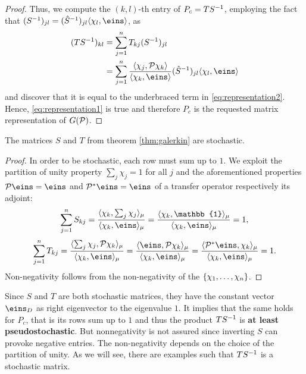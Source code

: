 \begin{proof}
Thus, we compute the $(k,l)$-th entry of $P_c = TS^{-1}$, employing the fact that $(S\inv)_{jl} = (\hat{S}\inv)_{jl} \langle \chi_l, \eins \rangle$, as
\begin{align*}
(TS^{-1})_{kl} & = \sum_{j=1}^n T_{kj} (S\inv)_{jl} \\
 &  = \sum_{j=1}^n \frac{\langle \chi_j, \Pcal \chi_k \rangle}{\langle \chi_k, \eins \rangle}
(\hat{S}\inv)_{jl} \langle \chi_l, \eins \rangle
\end{align*}
and discover that it is equal to the underbraced term in \eqref{eq:representation2}.
Hence, \eqref{eq:representation1} is true and therefore $P_c$ is the requested matrix representation of $G(\mathcal{P})$.
\end{proof}

\begin{thm}
\label{thm:galerkin_stochastic}
The matrices $S$ and $T$ from theorem \ref{thm:galerkin} are stochastic.
\end{thm}
\begin{proof}
In order to be stochastic, each row must sum up to $1$. We exploit the partition of unity property $\sum_j \chi_j = 1$ for all $j$ and the aforementioned properties $\Pcal  \eins =  \eins$ and $\Pcal^{*} \eins = \eins$ of a transfer operator respectively its adjoint:
\begin{equation*}
\sum_{j=1}^n S_{kj}
= \frac{\langle \chi_k, \sum_j\chi_j \rangle_\mu}{\langle \chi_k, \eins \rangle_\mu}
= \frac{\langle \chi_k, \mathbb{1} \rangle_\mu}{\langle \chi_k, \eins \rangle_\mu} =1,
\end{equation*}
\begin{equation*}
\sum_{j=1}^n T_{kj}
= \frac{\langle \sum_j \chi_j, \Pcal \chi_k \rangle_\mu}{\langle \chi_k, \eins \rangle_\mu}
= \frac{\langle \eins, \Pcal \chi_k \rangle_\mu}{\langle \chi_k, \eins \rangle_\mu}
= \frac{\langle \Pcal^{*} \eins, \chi_k \rangle_\mu}{\langle \chi_k, \eins \rangle_\mu}
= 1.
\end{equation*}
Non-negativity follows from the non-negativity of the $\{\chi_1,\dots,\chi_n \}$.
\end{proof}
Since $S$ and $T$ are both stochastic matrices, they have the constant vector $\eins_D$ as right eigenvector to the eigenvalue $1$. It implies that the same holds for $P_c$, that is
its rows sum up to $1$ and thus the product $TS^{-1}$ is \textbf{at least pseudostochastic}. But nonnegativity is not assured since inverting $S$ can provoke negative entries. The non-negativity depends on the choice of the partition of unity. As we will see, there are examples such that $TS^{-1}$ is a stochastic matrix.

